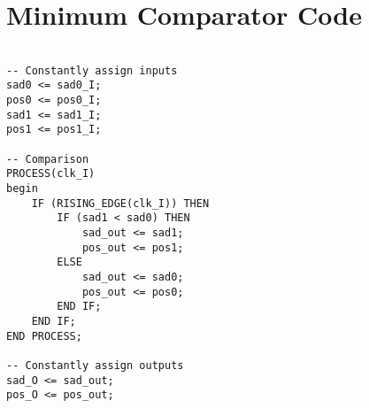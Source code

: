 \chapter{Minimum Comparator Code}
\label{sec:appdxC}



\begin{lstlisting}

-- Constantly assign inputs
sad0 <= sad0_I;
pos0 <= pos0_I;
sad1 <= sad1_I;
pos1 <= pos1_I;

-- Comparison
PROCESS(clk_I)
begin
	IF (RISING_EDGE(clk_I)) THEN
		IF (sad1 < sad0) THEN
			sad_out <= sad1;
			pos_out <= pos1;
		ELSE
			sad_out <= sad0;
			pos_out <= pos0;
		END IF;
	END IF;
END PROCESS;

-- Constantly assign outputs
sad_O <= sad_out;
pos_O <= pos_out;

\end{lstlisting}